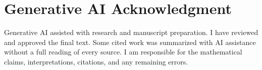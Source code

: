 \documentclass[10pt]{article}
\begin{document}
\section*{Generative AI Acknowledgment}
Generative AI assisted with research and manuscript preparation. I have reviewed and approved the final text. Some cited work was summarized with AI assistance without a full reading of every source. I am responsible for the mathematical claims, interpretations, citations, and any remaining errors.

{\small


}
\end{document}
